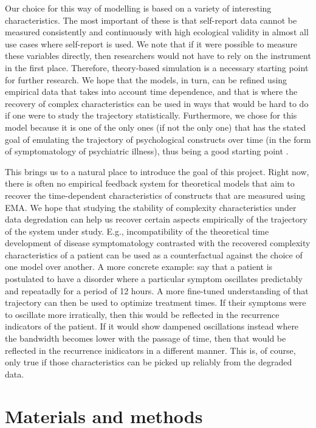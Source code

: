 \documentclass[utf8]{FrontiersinVancouver}
\begin{document}
Our choice for this way of modelling is based on a variety of interesting characteristics. The most important of these is that self-report data cannot be measured consistently and continuously with high ecological validity in almost all use cases where self-report is used. We note that if it were possible to measure these variables directly, then researchers would not have to rely on the instrument in the first place. Therefore, theory-based simulation is a necessary starting point for further research. We hope that the models, in turn, can be refined using empirical data that takes into account time dependence, and that is where the recovery of complex characteristics can be used in ways that would be hard to do if one were to study the trajectory statistically. Furthermore, we chose for this model because it is one of the only ones (if not the only one) that has the stated goal of emulating the trajectory of psychological constructs over time (in the form of symptomatology of psychiatric illness), thus being a good starting point . 

This brings us to a natural place to introduce the goal of this project. Right now, there is often no empirical feedback system for theoretical models that aim to recover the time-dependent characteristics of constructs that are measured using EMA. We hope that studying the stability of complexity characteristics under data degredation can help us recover certain aspects empirically of the trajectory of the system under study. E.g., incompatibility of the theoretical time development of disease symptomatology contrasted with the recovered complexity characteristics of a patient can be used as a counterfactual against the choice of one model over another. A more concrete example: say that a patient is postulated to have a disorder where a particular symptom oscillates predictably and repeatadly for a period of 12 hours. A more fine-tuned understanding of that trajectory can then be used to optimize treatment times. If their symptoms were to oscillate more irratically, then this would be reflected in the recurrence indicators of the patient. If it would show dampened oscillations instead where the bandwidth becomes lower with the passage of time, then that would be reflected in the recurrence inidicators in a different manner. This is, of course, only true if those characteristics can be picked up reliably from the degraded data. 

\section{Materials and methods}
\end{document}
